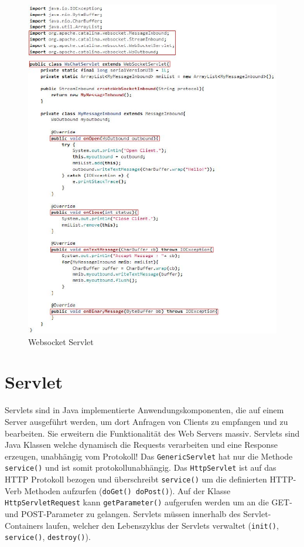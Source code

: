 \begin{figure}[h!]
	\centering
	\includegraphics[width=0.6\linewidth]{fig/java-websocket-servlet}
	\caption{Websocket Servlet}
	\label{fig:java-websocket-servlet}
\end{figure}


\newpage
\section{Servlet}
Servlets sind in Java implementierte Anwendungskomponenten, die auf einem Server ausgeführt werden, um dort Anfragen von Clients zu empfangen und zu bearbeiten. Sie erweitern die Funktionalität des Web Servers massiv. Servlets sind Java Klassen welche dynamisch die Requests verarbeiten und eine Response erzeugen, unabhängig vom Protokoll! Das \verb|GenericServlet| hat nur die Methode \verb|service()| und ist somit protokollunabhängig. Das \verb|HttpServlet| ist auf das HTTP Protokoll bezogen und überschreibt \verb|service()| um die definierten HTTP-Verb Methoden aufzurfen (\verb|doGet() doPost()|). Auf der Klasse \verb|HttpServletRequest| kann \verb|getParameter()| aufgerufen werden um an die GET- und POST-Parameter zu gelangen. Servlets müssen innerhalb des Servlet-Containers laufen, welcher den Lebenszyklus der Servlets verwaltet (\verb|init()|, \verb|service()|, \verb|destroy()|).

